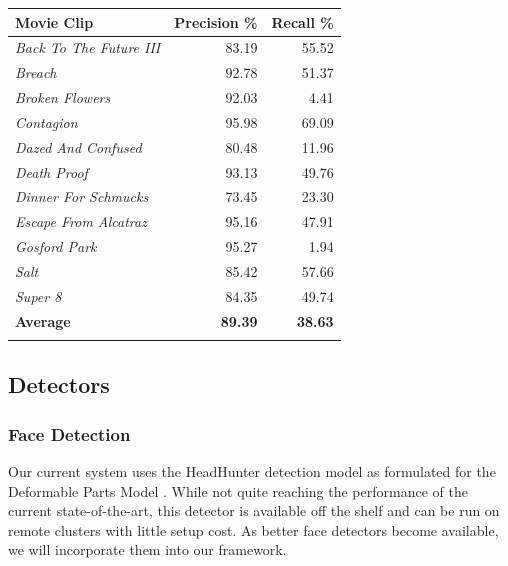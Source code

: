 \begin{center}
  \begin{tabular}{ l | r r }
    Movie Clip & Precision \% & Recall \% \\
    \hline
    \textit{ Back To The Future III } &  83.19 &  55.52\\
    \textit{ Breach } &  92.78 &  51.37\\
    \textit{ Broken Flowers } &  92.03 &  4.41\\
    \textit{ Contagion } &  95.98 &  69.09\\
    \textit{ Dazed And Confused } &  80.48 &  11.96\\
    \textit{ Death Proof } &  93.13 &  49.76\\
    \textit{ Dinner For Schmucks } &  73.45 &  23.30\\
    \textit{ Escape From Alcatraz } &  95.16 &  47.91\\
    \textit{ Gosford Park } &  95.27 &  1.94\\
    \textit{ Salt } &  85.42 &  57.66\\
    \textit{ Super 8 } &  84.35 &  49.74\\
    \textbf{ Average } &  \textbf{89.39} &  \textbf{38.63}\\
    \label{tab:shotdetResults}
  \end{tabular}
\end{center}
    

\subsection*{Detectors}
\subsubsection*{Face Detection}
Our current system uses the HeadHunter \cite{mathias_face_2014} detection model as formulated for the Deformable Parts Model \cite{lsvm-pami}. While not quite reaching the performance of the current state-of-the-art, this detector is available off the shelf and can be run on remote clusters with little setup cost. As better face detectors become available, we will incorporate them into our framework.

